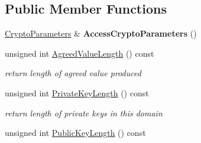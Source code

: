 \subsection*{Public Member Functions}
\begin{DoxyCompactItemize}
\item 
\hypertarget{class_d_l___simple_key_agreement_domain_base_a87e47aa9cc5343877270960680d51e3f}{
\hyperlink{class_crypto_parameters}{CryptoParameters} \& {\bfseries AccessCryptoParameters} ()}
\label{class_d_l___simple_key_agreement_domain_base_a87e47aa9cc5343877270960680d51e3f}

\item 
\hypertarget{class_d_l___simple_key_agreement_domain_base_a3c106455bfa82eb09e03686c9ad2771a}{
unsigned int \hyperlink{class_d_l___simple_key_agreement_domain_base_a3c106455bfa82eb09e03686c9ad2771a}{AgreedValueLength} () const }
\label{class_d_l___simple_key_agreement_domain_base_a3c106455bfa82eb09e03686c9ad2771a}

\begin{DoxyCompactList}\small\item\em return length of agreed value produced \item\end{DoxyCompactList}\item 
\hypertarget{class_d_l___simple_key_agreement_domain_base_af91beaef1fe92657a62f53915c6d58c7}{
unsigned int \hyperlink{class_d_l___simple_key_agreement_domain_base_af91beaef1fe92657a62f53915c6d58c7}{PrivateKeyLength} () const }
\label{class_d_l___simple_key_agreement_domain_base_af91beaef1fe92657a62f53915c6d58c7}

\begin{DoxyCompactList}\small\item\em return length of private keys in this domain \item\end{DoxyCompactList}\item 
\hypertarget{class_d_l___simple_key_agreement_domain_base_aeb0120a4c4170c0c6571e6800d92f2fe}{
unsigned int \hyperlink{class_d_l___simple_key_agreement_domain_base_aeb0120a4c4170c0c6571e6800d92f2fe}{PublicKeyLength} () const }
\label{class_d_l___simple_key_agreement_domain_base_aeb0120a4c4170c0c6571e6800d92f2fe}


\end{DoxyCompactItemize}

